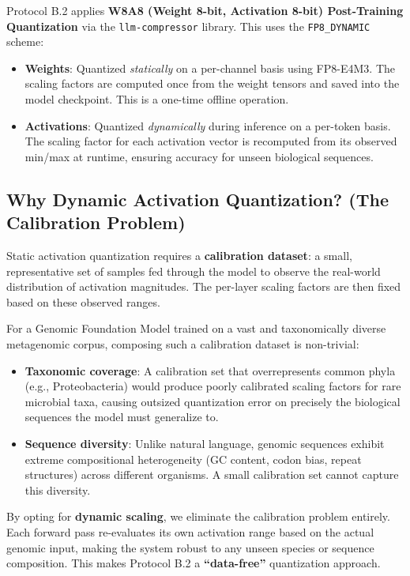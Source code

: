 \documentclass[12pt]{article}
\begin{document}
Protocol B.2 applies \textbf{W8A8 (Weight 8-bit, Activation 8-bit) Post-Training Quantization} via the \texttt{llm-compressor} library. This uses the \texttt{FP8\_DYNAMIC} scheme:
\begin{itemize}
    \item \textbf{Weights}: Quantized \emph{statically} on a per-channel basis using FP8-E4M3. The scaling factors are computed once from the weight tensors and saved into the model checkpoint. This is a one-time offline operation.
    \item \textbf{Activations}: Quantized \emph{dynamically} during inference on a per-token basis. The scaling factor for each activation vector is recomputed from its observed min/max at runtime, ensuring accuracy for unseen biological sequences.
\end{itemize}

\subsection{Why Dynamic Activation Quantization? (The Calibration Problem)}

Static activation quantization requires a \textbf{calibration dataset}: a small, representative set of samples fed through the model to observe the real-world distribution of activation magnitudes. The per-layer scaling factors are then fixed based on these observed ranges.

For a Genomic Foundation Model trained on a vast and taxonomically diverse metagenomic corpus, composing such a calibration dataset is non-trivial:
\begin{itemize}
    \item \textbf{Taxonomic coverage}: A calibration set that overrepresents common phyla (e.g., Proteobacteria) would produce poorly calibrated scaling factors for rare microbial taxa, causing outsized quantization error on precisely the biological sequences the model must generalize to.
    \item \textbf{Sequence diversity}: Unlike natural language, genomic sequences exhibit extreme compositional heterogeneity (GC content, codon bias, repeat structures) across different organisms. A small calibration set cannot capture this diversity.
\end{itemize}

By opting for \textbf{dynamic scaling}, we eliminate the calibration problem entirely. Each forward pass re-evaluates its own activation range based on the actual genomic input, making the system robust to any unseen species or sequence composition. This makes Protocol B.2 a \textbf{``data-free''} quantization approach.
\end{document}
